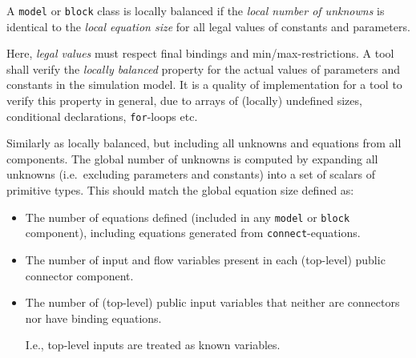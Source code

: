 \begin{definition}
A \lstinline!model! or \lstinline!block! class is locally balanced if the \emph{local number of unknowns} is identical to the \emph{local equation size} for all legal values of constants and parameters.
\end{definition}

\begin{nonnormative}
Here, \emph{legal values} must respect final bindings and min/max-restrictions.
A tool shall verify the \emph{locally balanced} property for the actual values of parameters and constants in the simulation model.
It is a quality of implementation for a tool to verify this property in general, due to arrays of (locally) undefined sizes, conditional declarations, \lstinline!for!-loops etc.
\end{nonnormative}

\begin{definition}
Similarly as locally balanced, but including all unknowns and equations
from all components. The global number of unknowns is computed by
expanding all unknowns (i.e.\ excluding parameters and constants) into a
set of scalars of primitive types. This should match the global equation
size defined as:
\begin{itemize}
\item
  The number of equations defined (included in any \lstinline!model! or \lstinline!block! component), including equations generated from \lstinline!connect!-equations.
\item
  The number of input and flow variables present in each (top-level) public connector component.
\item
  The number of (top-level) public input variables that neither are connectors nor have binding equations.
  \begin{nonnormative}
  I.e., top-level inputs are treated as known variables.
  \end{nonnormative}
\end{itemize}
\end{definition}

